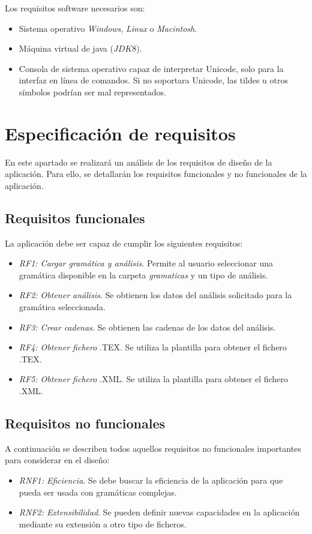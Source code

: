 Los requisitos software necesarios son:
\begin{itemize}
\item Sistema operativo \textit{Windows}, \textit{Linux} o \textit{Macintosh}.
\item Máquina virtual de java ($JDK 8$).
\item Consola de sistema operativo capaz de interpretar Unicode, solo para la interfaz en línea de comandos. Si no soportara Unicode, las tildes u otros símbolos podrían ser mal representados.
\end{itemize}

\section{Especificación de requisitos}
En este apartado se realizará un análisis de los requisitos de diseño de la aplicación. Para ello, se detallarán los requisitos funcionales y no funcionales de la aplicación.

\subsection{Requisitos funcionales}
La aplicación debe ser capaz de cumplir los siguientes requisitos:

\begin{itemize}
\item \textit{RF1: Cargar gramática y análisis}. Permite al usuario seleccionar una gramática disponible en la carpeta \textit{gramaticas} y un tipo de análisis.
\item \textit{RF2: Obtener análisis}. Se obtienen los datos del análisis solicitado para la gramática seleccionada.
\item \textit{RF3: Crear cadenas}. Se obtienen las cadenas de los datos del análisis.
\item \textit{RF4: Obtener fichero} .TEX. Se utiliza la plantilla para obtener el fichero .TEX.
\item \textit{RF5: Obtener fichero} .XML. Se utiliza la plantilla para obtener el fichero .XML.
\end{itemize}



\subsection{Requisitos no funcionales}
A continuación se describen todos aquellos requisitos no funcionales importantes para considerar en el diseño:


\begin{itemize}
\item \textit{RNF1: Eficiencia}. Se debe buscar la eficiencia de la aplicación para que pueda ser usada con gramáticas complejas.
\item \textit{RNF2: Extensibilidad}. Se pueden definir nuevas capacidades en la aplicación mediante su extensión a otro tipo de ficheros.
\end{itemize}